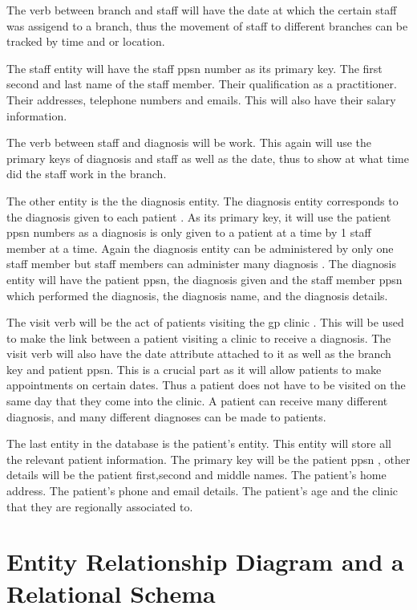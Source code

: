 \documentclass{article}
\begin{document}
The verb between branch and staff will have the date at which the certain staff was assigend to a branch, thus the movement of staff to different branches can be tracked by time and or location.


The staff entity will have the staff ppsn number as its primary key. The first second and last name of the staff member. Their qualification as a practitioner. Their addresses, telephone numbers and emails. This will also have their salary information.


The verb between staff and diagnosis will be work. This again will use the primary keys of diagnosis and staff as well as the date, thus to show at what time did the staff work in the branch. 






The other entity is the the diagnosis entity. The diagnosis entity corresponds to the diagnosis given to each patient .
As its primary key, it will use the patient ppsn numbers as a diagnosis is only given to a patient at a time by 1 staff member at a time. Again the diagnosis entity can be administered by only one staff member but staff members can administer many diagnosis .
The diagnosis entity will have the patient  ppsn, the diagnosis given and the staff member ppsn which performed the diagnosis, the diagnosis name, and the diagnosis details.


The visit verb will be the act of patients visiting the gp clinic . This will be used to make the link between a patient visiting a clinic to receive a diagnosis. The visit verb will also have the date attribute attached to it as well as the branch key and patient ppsn. This is a crucial part as it will allow patients to make appointments on certain dates. Thus a patient does not have to be visited on the same day that they come into the clinic.
A patient can receive many different diagnosis, and many different diagnoses can be made to patients.


The last entity in the database is the patient's entity. This entity will store all the relevant patient information. The primary key will be the patient ppsn , other details will be the patient first,second and middle names. The patient's home address. The patient's phone and email details. The patient's age and the clinic that they are regionally associated to. 







\section{Entity Relationship Diagram and a Relational Schema}
\end{document}
